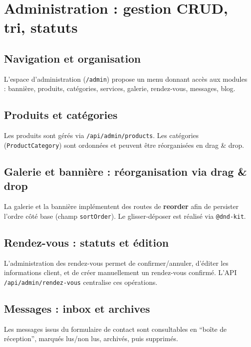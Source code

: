 \section{Administration : gestion CRUD, tri, statuts}

\subsection{Navigation et organisation}
L’espace d’administration (\texttt{/admin}) propose un menu donnant accès aux modules : bannière, produits, catégories, services, galerie, rendez-vous, messages, blog.

\subsection{Produits et catégories}
Les produits sont gérés via \texttt{/api/admin/products}. Les catégories (\texttt{ProductCategory}) sont ordonnées et peuvent être réorganisées en drag \& drop.

\subsection{Galerie et bannière : réorganisation via drag \& drop}
La galerie et la bannière implémentent des routes de \textbf{reorder} afin de persister l’ordre côté base (champ \texttt{sortOrder}). Le glisser-déposer est réalisé via \texttt{@dnd-kit}.

\subsection{Rendez-vous : statuts et édition}
L’administration des rendez-vous permet de confirmer/annuler, d’éditer les informations client, et de créer manuellement un rendez-vous confirmé. L’API \texttt{/api/admin/rendez-vous} centralise ces opérations.

\subsection{Messages : inbox et archives}
Les messages issus du formulaire de contact sont consultables en “boîte de réception”, marqués lus/non lus, archivés, puis supprimés.

